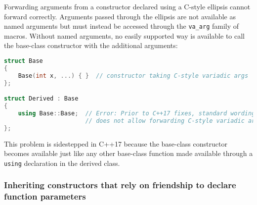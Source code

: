 Forwarding arguments from a constructor declared using a C-style ellipsis cannot forward correctly. Arguments passed through the ellipsis are not available as named arguments but must instead be accessed through the \texttt{va\_arg} family of macros. Without named arguments, no easily supported way is available to call the base-class constructor with the additional arguments:
\begin{lstlisting}[language=C++]
struct Base
{
    Base(int x, ...) { }  // constructor taking C-style variadic args
};

struct Derived : Base
{
    using Base::Base;  // Error: Prior to C++17 fixes, standard wording
                       // does not allow forwarding C-style variadic args.
};
\end{lstlisting}
    This problem is sidestepped in C++17 because the base-class constructor becomes available just like any other base-class function made available through a \texttt{using} declaration in the derived class.
    
\subsubsection[Inheriting constructors that rely on friendship to declare function parameters]{Inheriting constructors that rely on friendship to declare\\ function parameters}

